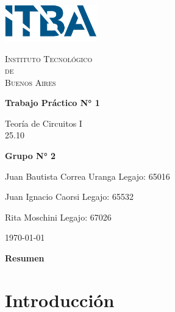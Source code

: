 \documentclass{article}
\newcommand{\Facultad}{Instituto Tecnológico \\de\\ Buenos Aires} %
\newcommand{\TPn}{Trabajo Práctico N° 1}
\begin{document}
    \begin{titlepage} %

        \begin{flushleft}
            \centering
            \includegraphics[width=0.3\textwidth]{Logo_ITBA.png}
        \end{flushleft}

        \centering
            
        {\scshape\LARGE \Facultad \par} %
        \vspace{1cm}                    %


        {\huge\bfseries \TPn \par}
        \vspace{1.5cm}
        {\Large Teoría de Circuitos I\\ 25.10 \par}
        \vfill                      %
        {\Large \bfseries Grupo N° 2 \par}
        \vspace{1cm}
        {\large Juan Bautista Correa Uranga \hfill Legajo: 65016 \par} %
        {\large Juan Ignacio Caorsi \hfill Legajo: 65532  \par}
        {\large Rita Moschini \hfill Legajo: 67026 \par} 
        \vfill
        {\large \today\par}
        \vfil

    \end{titlepage}


    {\centering \LARGE \bfseries Resumen \par}

    \newpage

    \tableofcontents %
    \newpage

    \section{Introducción}
\end{document}
